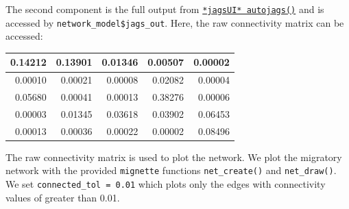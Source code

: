 \documentclass[
]{book}
\newenvironment{Shaded}{\begin{snugshade}}{\end{snugshade}}
\newcommand{\NormalTok}[1]{#1}
\newcommand{\OtherTok}[1]{\textcolor[rgb]{0.56,0.35,0.01}{#1}}
\newcommand{\SpecialCharTok}[1]{\textcolor[rgb]{0.81,0.36,0.00}{\textbf{#1}}}
\begin{document}
The second component is the full output from \href{https://rdrr.io/cran/jagsUI/man/autojags.html}{\texttt{*jagsUI*\ autojags()}} and is accessed by \texttt{network\_model\$jags\_out}. Here, the raw connectivity matrix can be accessed:

\begin{Shaded}
\end{Shaded}

\begin{tabular}{r|r|r|r|r}
\hline
0.14212 & 0.13901 & 0.01346 & 0.00507 & 0.00002\\
\hline
0.00010 & 0.00021 & 0.00008 & 0.02082 & 0.00004\\
\hline
0.05680 & 0.00041 & 0.00013 & 0.38276 & 0.00006\\
\hline
0.00003 & 0.01345 & 0.03618 & 0.03902 & 0.06453\\
\hline
0.00013 & 0.00036 & 0.00022 & 0.00002 & 0.08496\\
\hline
\end{tabular}

The raw connectivity matrix is used to plot the network. We plot the migratory network with the provided \texttt{mignette} functions \texttt{net\_create()} and \texttt{net\_draw()}. We set \texttt{connected\_tol\ =\ 0.01} which plots only the edges with connectivity values of greater than 0.01.
\end{document}
